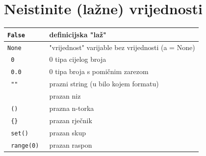 \documentclass[10pt]{article}
\begin{document}
    \section*{\color{NavyBlue} Neistinite (lažne) vrijednosti}
    \begin{tabular}{|>{\tt}p{9.00cm}|>{}p{15.50cm}|}
        \hline
        False & definicijska "laž"                                      \\ \hline
        None  & "vrijednost" varijable bez vrijednosti (a = None)       \\ \hline                            
        0     & 0 tipa cijelog broja                                    \\ \hline
        0.0   & 0 tipa broja s pomičnim zarezom                         \\ \hline
        ""    & prazni string (u bilo kojem formatu)                    \\ \hline
        []    & prazan niz                                              \\ \hline
        ()    & prazna n-torka                                          \\ \hline
        \{\}  & prazan rječnik                                          \\ \hline
        set() & prazan skup                                             \\ \hline
        range(0) & prazan raspon                                        \\ \hline
    \end{tabular}
\end{document}
